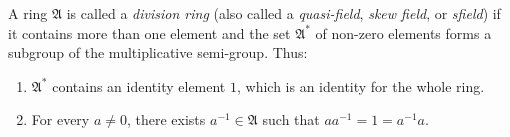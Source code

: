 A ring $\mathfrak{A}$ is called a \emph{division ring} (also called a \emph{quasi-field}, \emph{skew field}, or \emph{sfield}) if it contains more than one element and the set $\mathfrak{A}^*$ of non-zero elements forms a subgroup of the multiplicative semi-group. Thus:
\begin{enumerate}
\item $\mathfrak{A}^*$ contains an identity element $1$, which is an identity for the whole ring.
\item For every $a \neq 0$, there exists $a^{-1} \in \mathfrak{A}$ such that $aa^{-1} = 1 = a^{-1}a$.
\end{enumerate}
